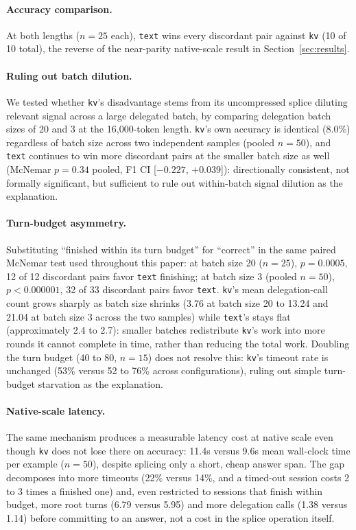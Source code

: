 \documentclass[11pt]{article}
\begin{document}
\paragraph{Accuracy comparison.} At both lengths ($n=25$ each),
\texttt{text} wins every discordant pair against \texttt{kv} (10 of
10 total), the reverse of the near-parity native-scale result in
Section~\ref{sec:results}.

\paragraph{Ruling out batch dilution.} We tested whether \texttt{kv}'s
disadvantage stems from its uncompressed splice diluting relevant
signal across a large delegated batch, by comparing delegation batch
sizes of 20 and 3 at the 16,000-token length. \texttt{kv}'s own
accuracy is identical (8.0\%) regardless of batch size across two
independent samples (pooled $n=50$), and \texttt{text} continues to
win more discordant pairs at the smaller batch size as well (McNemar
$p=0.34$ pooled, F1 CI [$-0.227$, $+0.039$]): directionally
consistent, not formally significant, but sufficient to rule out
within-batch signal dilution as the explanation.

\paragraph{Turn-budget asymmetry.} Substituting ``finished within its
turn budget'' for ``correct'' in the same paired McNemar test used
throughout this paper: at batch size 20 ($n=25$), $p=0.0005$, 12 of 12
discordant pairs favor \texttt{text} finishing; at batch size 3
(pooled $n=50$), $p<0.000001$, 32 of 33 discordant pairs favor
\texttt{text}. \texttt{kv}'s mean delegation-call count grows sharply
as batch size shrinks (3.76 at batch size 20 to 13.24 and 21.04 at
batch size 3 across the two samples) while \texttt{text}'s stays flat
(approximately 2.4 to 2.7): smaller batches redistribute \texttt{kv}'s
work into more rounds it cannot complete in time, rather than reducing
the total work. Doubling the turn budget (40 to 80, $n=15$) does not
resolve this: \texttt{kv}'s timeout rate is unchanged (53\% versus 52
to 76\% across configurations), ruling out simple turn-budget
starvation as the explanation.

\paragraph{Native-scale latency.} The same mechanism produces a
measurable latency cost at native scale even though \texttt{kv} does
not lose there on accuracy: 11.4s versus 9.6s mean wall-clock time per
example ($n=50$), despite splicing only a short, cheap answer span.
The gap decomposes into more timeouts (22\% versus 14\%, and a
timed-out session costs 2 to 3 times a finished one) and, even
restricted to sessions that finish within budget, more root turns
(6.79 versus 5.95) and more delegation calls (1.38 versus 1.14) before
committing to an answer, not a cost in the splice operation itself.
\end{document}
